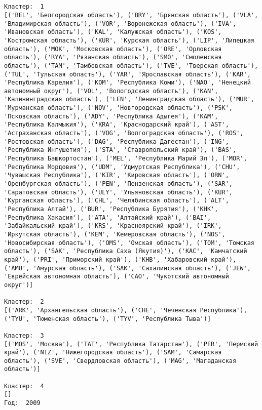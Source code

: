 \documentclass[11pt]{article}
\begin{document}
    \begin{center}
    \end{center}
    { \hspace*{\fill} \\}
    
    \begin{Verbatim}[commandchars=\\\{\}]

Кластер:  1
[('BEL', 'Белгородская область'), ('BRY', 'Брянская область'), ('VLA', 'Владимирская область'), ('VOR', 'Воронежская область'), ('IVA', 'Ивановская область'), ('KAL', 'Калужская область'), ('KOS', 'Костромская область'), ('KUR', 'Курская область'), ('LIP', 'Липецкая область'), ('MOK', 'Московская область'), ('ORE', 'Орловская область'), ('RYA', 'Рязанская область'), ('SMO', 'Смоленская область'), ('TAM', 'Тамбовская область'), ('TVE', 'Тверская область'), ('TUL', 'Тульская область'), ('YAR', 'Ярославская область'), ('KAR', 'Республика Карелия'), ('KOM', 'Республика Коми'), ('NAO', 'Ненецкий автономный округ'), ('VOL', 'Вологодская область'), ('KAN', 'Калинингpадская область'), ('LEN', 'Ленинградская область'), ('MUR', 'Мурманская область'), ('NOV', 'Новгородская область'), ('PSK', 'Псковская область'), ('ADY', 'Республика Адыгея'), ('KAM', 'Республика Калмыкия'), ('KRA', 'Краснодарский край'), ('AST', 'Астраханская область'), ('VOG', 'Волгоградская область'), ('ROS', 'Ростовская область'), ('DAG', 'Республика Дагестан'), ('ING', 'Республика Ингушетия'), ('STA', 'Ставропольский край'), ('BAS', 'Республика Башкортостан'), ('MEL', 'Республика Марий Эл'), ('MOR', 'Республика Мордовия'), ('UDM', 'Удмуртская Республика'), ('CHU', 'Чувашская Республика'), ('KIR', 'Кировская область'), ('ORN', 'Оренбургская область'), ('PEN', 'Пензенская область'), ('SAR', 'Саратовская область'), ('ULY', 'Ульяновская область'), ('KUR', 'Курганская область'), ('CHL', 'Челябинская область'), ('ALT', 'Республика Алтай'), ('BUR', 'Республика Бурятия'), ('KHK', 'Республика Хакасия'), ('ATA', 'Алтайский край'), ('BAI', 'Забайкальский край'), ('KRS', 'Красноярский край'), ('IRK', 'Иркутская область'), ('KEM', 'Кемеровская область'), ('NOS', 'Новосибирская область'), ('OMS', 'Омская область'), ('TOM', 'Томская область'), ('SAK', 'Республика Саха (Якутия)'), ('KAC', 'Камчатский край'), ('PRI', 'Приморский край'), ('KHB', 'Хабаровский край'), ('AMU', 'Амурская область'), ('SAK', 'Сахалинская область'), ('JEW', 'Еврейская автономная область'), ('CAO', 'Чукотский автономный округ')]

Кластер:  2
[('ARK', 'Архангельская область'), ('CHE', 'Чеченская Республика'), ('TYU', 'Тюменская область'), ('TYV', 'Республика Тыва')]

Кластер:  3
[('MOS', 'Москва'), ('TAT', 'Республика Татарстан'), ('PER', 'Пермский край'), ('NIZ', 'Нижегородская область'), ('SAM', 'Самарская область'), ('SVE', 'Свердловская область'), ('MAG', 'Магаданская область')]

Кластер:  4
[]
Год:  2009

    \end{Verbatim}
\end{document}
